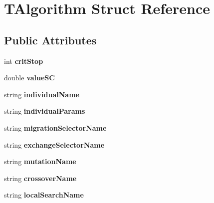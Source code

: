 \hypertarget{structTAlgorithm}{}\section{T\+Algorithm Struct Reference}
\label{structTAlgorithm}
\subsection*{Public Attributes}
\begin{DoxyCompactItemize}
\item 
\mbox{\label{structTAlgorithm_a5e7db46febcdf28a01d5e2e32547b976}} 
int {\bfseries crit\+Stop}
\item 
\mbox{\label{structTAlgorithm_a80ca0307e9bf6d720214af1246baf9d4}} 
double {\bfseries value\+SC}
\item 
\mbox{\label{structTAlgorithm_ab99e2fb15d3a6249af2f526283a5cd66}} 
string {\bfseries individual\+Name}
\item 
\mbox{\label{structTAlgorithm_a3d5c273a9c7a83a211ca321834c4fc71}} 
string {\bfseries individual\+Params}
\item 
\mbox{\label{structTAlgorithm_a56ceda030117e9fa883436fd3800fd0c}} 
string {\bfseries migration\+Selector\+Name}
\item 
\mbox{\label{structTAlgorithm_aed07e57052ddc6db16afc20473d2f9a2}} 
string {\bfseries exchange\+Selector\+Name}
\item 
\mbox{\label{structTAlgorithm_a8782ffcecaaa1bde0b1e564b157ea2fe}} 
string {\bfseries mutation\+Name}
\item 
\mbox{\label{structTAlgorithm_afdefbc9ce4b18ef6d403946cc3049d71}} 
string {\bfseries crossover\+Name}
\item 
\mbox{\label{structTAlgorithm_a4ea8eea24e6f3e234ab1ead97068664f}} 
string {\bfseries local\+Search\+Name}
\item 
\mbox{\label{structTAlgorithm_abe21dce696d82a955ae0afd359a00fe4}} 

\end{DoxyCompactItemize}
